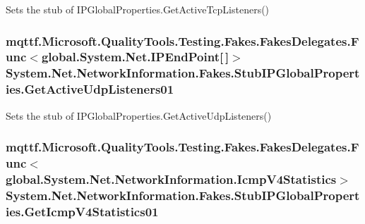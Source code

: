Sets the stub of I\-P\-Global\-Properties.\-Get\-Active\-Tcp\-Listeners()

\hypertarget{class_system_1_1_net_1_1_network_information_1_1_fakes_1_1_stub_i_p_global_properties_a17494b209a2301c574be207c621d74ce}{
\subsubsection[{Get\-Active\-Udp\-Listeners01}]{\setlength{\rightskip}{0pt plus 5cm}mqttf.\-Microsoft.\-Quality\-Tools.\-Testing.\-Fakes.\-Fakes\-Delegates.\-Func$<$global.\-System.\-Net.\-I\-P\-End\-Point\mbox{[}$\,$\mbox{]}$>$ System.\-Net.\-Network\-Information.\-Fakes.\-Stub\-I\-P\-Global\-Properties.\-Get\-Active\-Udp\-Listeners01}}\label{class_system_1_1_net_1_1_network_information_1_1_fakes_1_1_stub_i_p_global_properties_a17494b209a2301c574be207c621d74ce}


Sets the stub of I\-P\-Global\-Properties.\-Get\-Active\-Udp\-Listeners()

\hypertarget{class_system_1_1_net_1_1_network_information_1_1_fakes_1_1_stub_i_p_global_properties_a787494693f1c74c3ff8136ed18c213d4}{
\subsubsection[{Get\-Icmp\-V4\-Statistics01}]{\setlength{\rightskip}{0pt plus 5cm}mqttf.\-Microsoft.\-Quality\-Tools.\-Testing.\-Fakes.\-Fakes\-Delegates.\-Func$<$global.\-System.\-Net.\-Network\-Information.\-Icmp\-V4\-Statistics$>$ System.\-Net.\-Network\-Information.\-Fakes.\-Stub\-I\-P\-Global\-Properties.\-Get\-Icmp\-V4\-Statistics01}}\label{class_system_1_1_net_1_1_network_information_1_1_fakes_1_1_stub_i_p_global_properties_a787494693f1c74c3ff8136ed18c213d4}


